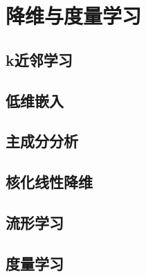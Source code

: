 \newpage
\section{降维与度量学习}
\subsection{k近邻学习}
\subsection{低维嵌入}
\subsection{主成分分析}
\subsection{核化线性降维}
\subsection{流形学习}
\subsection{度量学习}
